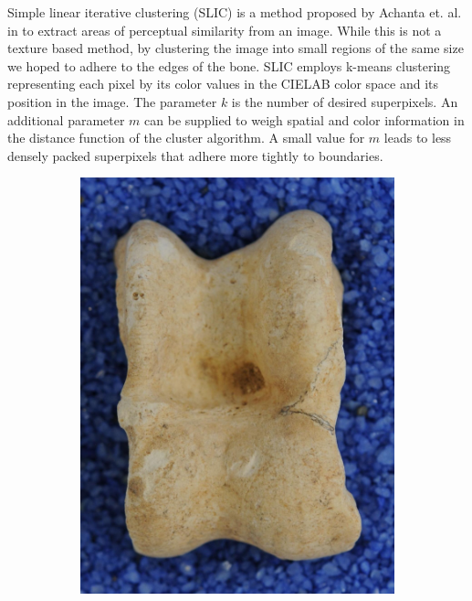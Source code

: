 \documentclass[pdftex,12pt,a4paper]{report}
\begin{document}
Simple linear iterative clustering (SLIC) is a method proposed by Achanta et. al. in \cite{achanta2012slic} to extract areas of perceptual similarity from an image. While this is not a texture based method, by clustering the image into small regions of the same size we hoped to adhere to the edges of the bone. SLIC employs k-means clustering representing each pixel by its color values in the CIELAB color space and its position in the image. The parameter $k$ is the number of desired superpixels. An additional parameter $m$ can be supplied to weigh spatial and color information in the distance function of the cluster algorithm. A small value for $m$ leads to less densely packed superpixels that adhere more tightly to boundaries.

\begin{figure}[h]
	\centering
	\begin{subfigure}[b]{0.24\textwidth}
		\centering
		\includegraphics[width=.9\linewidth]{img/segmentation/good/slic/cut.jpg}
		\subcaption{}
		\label{fig:slic:good}
	\end{subfigure}
	\begin{subfigure}[b]{0.24\textwidth}

\end{subfigure}
\end{figure}
\end{document}
